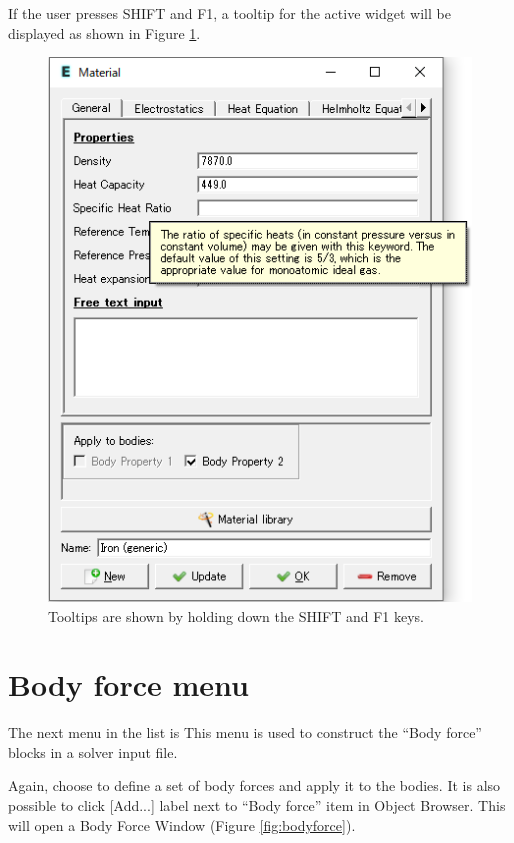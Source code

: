 If the user presses SHIFT and F1, a tooltip for the active widget will be displayed as shown in Figure \ref{fig:tooltip}.

\begin{figure}[htb]
	\begin{center}
		\includegraphics[scale=0.5]{images/tooltip.png}
		\caption{Tooltips are shown by holding down the SHIFT and F1 keys.}
		\label{fig:tooltip}
	\end{center}
\end{figure}

\section{Body force menu}

The next menu in the list is
 This menu is used to construct the ``Body force'' blocks in a
solver input file.

\noindent Again, choose
\noindent to define a set of body forces and apply it to the bodies. It is also possible to click [Add...] label next to ``Body force'' item in Object Browser. This will open a Body Force Window (Figure \ref{fig:bodyforce}).

